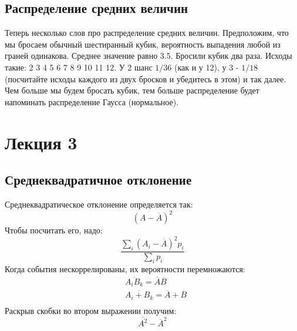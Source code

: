 \documentclass[a4paper, 12pt]{article}
\begin{document}
	\subsection{Распределение средних величин}
	Теперь несколько слов про распределение средних величин. Предположим, что мы бросаем обычный шестиранный кубик, вероятность выпадения любой из граней одинакова. Среднее значение равно 3.5. Бросили кубик два раза. Исходы такие: 2 3 4 5 6 7 8 9 10 11 12. У 2 шанс $1/36$ (как и у 12), у 3 - $1/18$ (посчитайте исходы каждого из двух бросков и убедитесь в этом) и так далее. Чем больше мы будем бросать кубик, тем больше распределение будет напоминать распределение Гаусса (нормальное). 
	\section{Лекция 3}
	\subsection{Среднеквадратичное отклонение}
	Среднеквадратическое отклонение определяется так:
	\begin{equation*}
		(A - \overline{A})^2
	\end{equation*}
	Чтобы посчитать его, надо:
	\begin{equation*}
		\frac{\sum_{i} (A_{i} - \overline{A})^2  p_{i} }{\sum_{i} p_{i}}
	\end{equation*}
	Когда события нескоррелированы, их вероятности перемножаются:
	\begin{equation*}
		\begin{aligned}
			& \overline{A_{i} B_{k}} = \overline{A} \overline{B}     \\
			& \overline{A_{i} + B_{k}} = \overline{A} + \overline{B} \\
		\end{aligned}
	\end{equation*}
	Раскрыв скобки во втором выражении получим:
	\begin{equation*}
		\overline{A^{2}} - \overline{A}^{2}
	\end{equation*}
\end{document}
